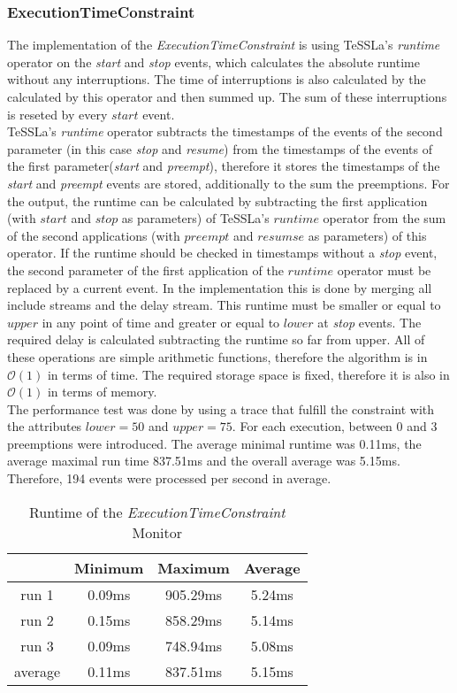 \subsubsection{ExecutionTimeConstraint}
	The implementation of the \emph{ExecutionTimeConstraint} is using TeSSLa's \emph{runtime} operator on the \emph{start} and \emph{stop} events, which calculates the absolute runtime without any interruptions. The time of interruptions is also calculated by the calculated by this operator and then summed up. The sum of these interruptions is reseted by every $start$ event.\\
	TeSSLa's \emph{runtime} operator subtracts the timestamps of the events of the second parameter (in this case \emph{stop} and \emph{resume}) from the timestamps of the events of the first parameter(\emph{start} and \emph{preempt}), therefore it stores the timestamps of the \emph{start} and \emph{preempt} events are stored, additionally to the sum the preemptions.
	For the output, the runtime can be calculated by subtracting the first application (with $start$ and $stop$ as parameters) of TeSSLa's $runtime$ operator from the sum of the second applications (with $preempt$ and $resumse$ as parameters) of this operator. If the runtime should be checked in timestamps without a \emph{stop} event, the second parameter of the first application of the $runtime$ operator must be replaced by a current event. In the implementation this is done by merging all include streams and the delay stream. This runtime must be smaller or equal to $upper$ in any point of time and greater or equal to $lower$ at \emph{stop} events. The required delay is calculated subtracting the runtime so far from upper. All of these operations are simple arithmetic functions, therefore the algorithm is in $\mathcal{O}(1)$ in terms of time. The required storage space is fixed, therefore it is also in $\mathcal{O}(1)$ in terms of memory.\\
	The performance test was done by using a trace that fulfill the constraint with the attributes $lower=50$ and $upper=75$. For each execution, between 0 and 3 preemptions were introduced. The average minimal runtime was 0.11ms, the average maximal run time 837.51ms and the overall average was 5.15ms. Therefore, 194 events were processed per second in average.
	\begin{table}
		\begin{tabular}{|c|c|c|c|}
			\hline
					& Minimum & Maximum & Average \\
			\hline
			run 1	& 0.09ms & 905.29ms & 5.24ms \\
			\hline
			run 2	& 0.15ms & 858.29ms & 5.14ms\\
			\hline
			run 3	& 0.09ms & 748.94ms & 5.08ms\\
			\hline
			average & 0.11ms & 837.51ms	& 5.15ms\\
			\hline
		\end{tabular}
		\centering
		\label{tab:runtimeExecutionTimeConstraint}
		\caption{Runtime of the \emph{ExecutionTimeConstraint} Monitor}
	\end{table}

